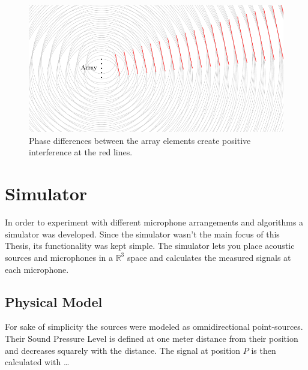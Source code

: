 \begin{figure}
  \centering
  \includegraphics[]{beamforming_1.pdf}
  \caption{Phase differences between the array elements create positive interference at the red lines.}
  \label{ssl:fig:beamforming1}
\end{figure}

\newpage
\section{Simulator}
In order to experiment with different microphone arrangements and algorithms a simulator was developed.
Since the simulator wasn't the main focus of this Thesis, its functionality was kept simple.
The simulator lets you place acoustic sources and microphones in a $\mathbb{R}^3$ space and calculates
the measured signals at each microphone.

\subsection{Physical Model}
For sake of simplicity the sources were modeled as omnidirectional point-sources. 
Their Sound Pressure Level is defined at one meter distance from their position and decreases 
squarely with the distance.
The signal at position $P$ is then calculated with \dots





